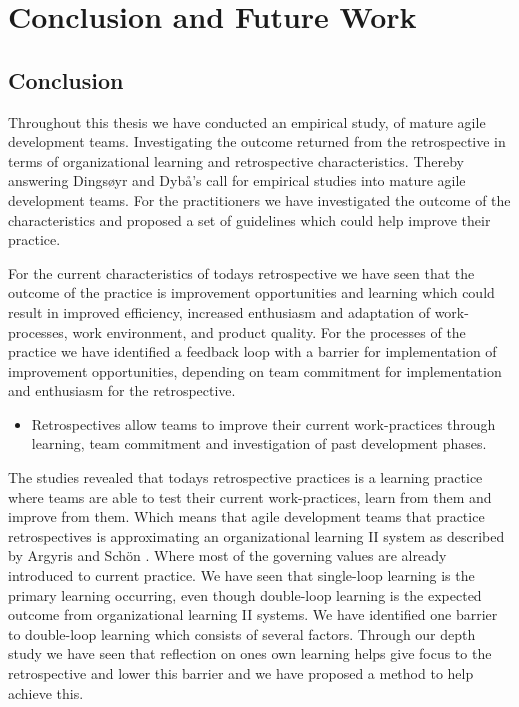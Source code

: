 \chapter{Conclusion and Future Work}
\section{Conclusion}
Throughout this thesis we have conducted an empirical study, of mature agile development teams. Investigating the outcome returned from the retrospective in terms of organizational learning and retrospective characteristics. Thereby answering Dingsøyr and Dybå’s call \cite{Dyba2008} for empirical studies into mature agile development teams. For the practitioners we have investigated the outcome of the characteristics and proposed a set of guidelines which could help improve their practice.

For the current characteristics of todays retrospective we have seen that the outcome of the practice is improvement opportunities and learning which could result in improved efficiency, increased enthusiasm and adaptation of work-processes, work environment, and product quality. For the processes of the practice we have identified a feedback loop with a barrier for implementation of improvement opportunities, depending on team commitment for implementation and enthusiasm for the retrospective. 

\begin{itemize}
\item Retrospectives allow teams to improve their current work-practices through learning, team commitment and investigation of past development phases.
\end{itemize}

The studies revealed that todays retrospective practices is a learning practice where teams are able to test their current work-practices, learn from them and improve from them. Which means that agile development teams that practice retrospectives is approximating an organizational learning II system as described by Argyris and Schön \cite{Argyris1996}. Where most of the governing values are already introduced to current practice. We have seen that single-loop learning is the primary learning occurring, even though double-loop learning is the expected outcome from organizational learning II systems. We have identified one barrier to double-loop learning which consists of several factors. Through our depth study we have seen that reflection on ones own learning helps give focus to the retrospective and lower this barrier and we have proposed a method to help achieve this. 


